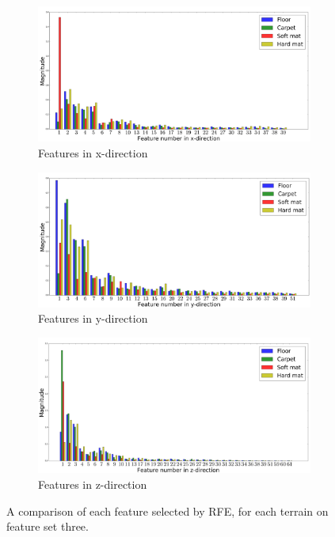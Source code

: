 \documentclass[USenglish]{ifimaster}  %
\begin{document}
\begin{figure} [h]
	\centering
	\begin{subfigure}[b]{\textwidth}
		\includegraphics[width=\textwidth,height=\textheight,keepaspectratio]{Figures/featureselx}
		\caption{Features in x-direction}
		\label{fig:featurex} 
	\end{subfigure}
	
	\begin{subfigure}[b]{\textwidth}
		\includegraphics[width=\textwidth,height=\textheight,keepaspectratio]{Figures/featuresely}
		\caption{Features in y-direction}
		\label{fig:featurey}
	\end{subfigure}
	
	\begin{subfigure}[h]{\textwidth}
		\includegraphics[width=\textwidth,height=\textheight,keepaspectratio]{Figures/featureselz}
		\caption{Features in z-direction}
		\label{fig:featurez}
	\end{subfigure}

	\caption[Comparison of each feature on different terrains selected from RFE]{A comparison of each feature selected by RFE, for each terrain on feature set three.}
	\label{fig:wrapperset5}
\end{figure}
\FloatBarrier
\end{document}
